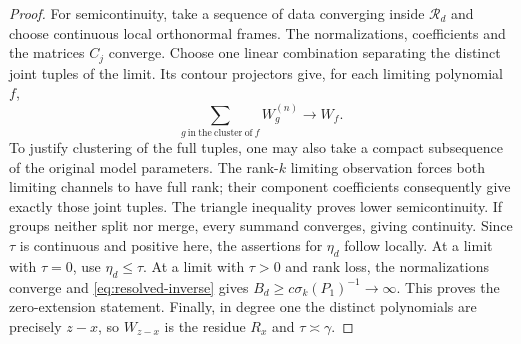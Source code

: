 \begin{proof}
For semicontinuity, take a sequence of data converging inside
$\mathcal R_d$ and choose continuous local orthonormal frames. The
normalizations, coefficients and the matrices $C_j$ converge. Choose
one linear combination separating the distinct joint tuples of the
limit. Its contour projectors give, for each limiting polynomial $f$,
\[
 \sum_{g\ \mathrm{in\ the\ cluster\ of}\ f} W_g^{(n)}\longrightarrow W_f.
\]
To justify clustering of the full tuples, one may also take a compact
subsequence of the original model parameters. The rank-$k$ limiting
observation forces both limiting channels to have full rank; their
component coefficients consequently give exactly those joint tuples.
The triangle inequality proves lower semicontinuity. If groups neither
split nor merge, every summand converges, giving continuity. Since
$\tau$ is continuous and positive here, the assertions for $\eta_d$
follow locally. At a limit with $\tau=0$, use $\eta_d\le\tau$.
At a limit with $\tau>0$ and rank loss, the normalizations converge and
\eqref{eq:resolved-inverse} gives
$B_d\ge c\sigma_k(P_1)^{-1}\to\infty$. This proves the zero-extension
statement. Finally, in degree one the distinct polynomials are precisely
$z-x$, so $W_{z-x}$ is the residue $R_x$ and $\tau\asymp\gamma$.
\end{proof}

